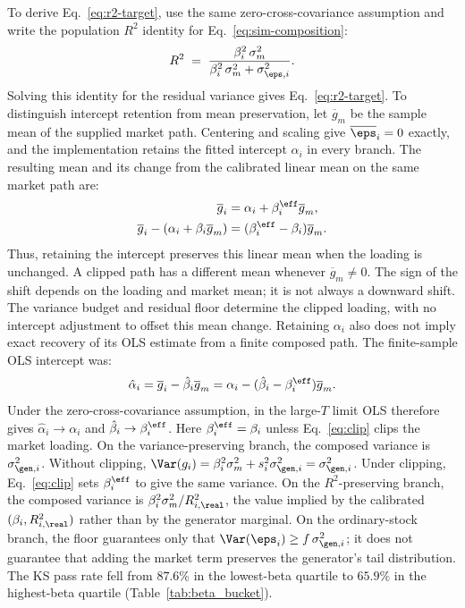 To derive Eq.~\eqref{eq:r2-target}, use the same zero-cross-covariance
assumption and write the population $R^2$ identity for
Eq.~\eqref{eq:sim-composition}:
\begin{equation}
  R^2 \;=\; \frac{\beta_i^2\, \sigma_m^2}{\beta_i^2\, \sigma_m^2 + \sigma_{\eps,i}^2}.
\end{equation}
Solving this identity for the residual variance gives
Eq.~\eqref{eq:r2-target}.
To distinguish intercept retention from mean preservation, let
$\overline{g}_m$ be the sample mean of the supplied market path.
Centering and scaling give $\overline{\eps}_i=0$ exactly, and the
implementation retains the fitted intercept $\alpha_i$ in every
branch. The resulting mean and its change from the calibrated linear
mean on the same market path are:
\begin{align}
  \overline{g}_i
    &= \alpha_i+\beta_i^{\eff}\overline{g}_m, \notag\\
  \overline{g}_i-(\alpha_i+\beta_i\overline{g}_m)
    &= (\beta_i^{\eff}-\beta_i)\overline{g}_m.
  \label{eq:supp-clipped-mean}
\end{align}
Thus, retaining the intercept preserves this linear mean when the
loading is unchanged. A clipped path has a different mean whenever
$\overline{g}_m\ne0$. The sign of the shift depends on the loading
and market mean; it is not always a downward shift. The variance
budget and residual floor determine the clipped loading, with no
intercept adjustment to offset this mean change. Retaining
$\alpha_i$ also does not imply exact recovery of its OLS estimate
from a finite composed path. The finite-sample OLS intercept was:
\begin{equation}
  \hat\alpha_i
  = \overline{g}_i-\hat\beta_i\overline{g}_m
  = \alpha_i-(\hat\beta_i-\beta_i^{\eff})\overline{g}_m.
\end{equation}
Under the zero-cross-covariance assumption, in the large-$T$ limit OLS
therefore gives $\hat\alpha_i \to \alpha_i$ and
$\hat\beta_i \to \beta_i^{\eff}$. Here
$\beta_i^{\eff}=\beta_i$ unless Eq.~\eqref{eq:clip} clips the market
loading. On the variance-preserving branch, the composed variance is
$\sigma_{\gen,i}^2$. Without clipping,
$\Var(g_i) = \beta_i^2 \sigma_m^2 + s_i^2 \sigma_{\gen,i}^2
  = \sigma_{\gen,i}^2$. Under clipping, Eq.~\eqref{eq:clip} sets
$\beta_i^{\eff}$ to give the same variance. On the $R^2$-preserving
branch, the composed variance is
$\beta_i^2 \sigma_m^2 / R^2_{i,\real}$, the value implied by the
calibrated $(\beta_i, R^2_{i,\real})$ rather than by the generator
marginal. On the ordinary-stock branch, the floor guarantees only that
$\Var(\eps_i)\geq f\,\sigma_{\gen,i}^2$; it does not guarantee that
adding the market term preserves the generator's tail distribution.
The KS pass rate fell from $87.6\%$ in the lowest-beta quartile to
$65.9\%$ in the highest-beta quartile (Table~\ref{tab:beta_bucket}).

